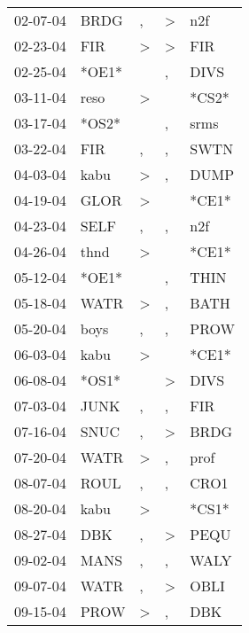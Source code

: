 \begin{supertabular}{lllll}
 02-07-04 &   BRDG &                , &     \textgreater &    n2f \\
 02-23-04 &    FIR &     \textgreater &     \textgreater &    FIR \\
 02-25-04 &  *OE1* &                  &                , &   DIVS \\
 03-11-04 &   reso &     \textgreater &                  &  *CS2* \\
 03-17-04 &  *OS2* &                  &                , &   srms \\
 03-22-04 &    FIR &                , &                , &   SWTN \\
 04-03-04 &   kabu &     \textgreater &                , &   DUMP \\
 04-19-04 &   GLOR &     \textgreater &                  &  *CE1* \\
 04-23-04 &   SELF &                , &                , &    n2f \\
 04-26-04 &   thnd &     \textgreater &                  &  *CE1* \\
 05-12-04 &  *OE1* &                  &                , &   THIN \\
 05-18-04 &   WATR &     \textgreater &                , &   BATH \\
 05-20-04 &   boys &                , &                , &   PROW \\
 06-03-04 &   kabu &     \textgreater &                  &  *CE1* \\
 06-08-04 &  *OS1* &                  &     \textgreater &   DIVS \\
 07-03-04 &   JUNK &                , &                , &    FIR \\
 07-16-04 &   SNUC &                , &     \textgreater &   BRDG \\
 07-20-04 &   WATR &     \textgreater &                , &   prof \\
 08-07-04 &   ROUL &                , &                , &   CRO1 \\
 08-20-04 &   kabu &     \textgreater &                  &  *CS1* \\
 08-27-04 &    DBK &                , &     \textgreater &   PEQU \\
 09-02-04 &   MANS &                , &                , &   WALY \\
 09-07-04 &   WATR &                , &     \textgreater &   OBLI \\
 09-15-04 &   PROW &     \textgreater &                , &    DBK \\

\end{supertabular}
